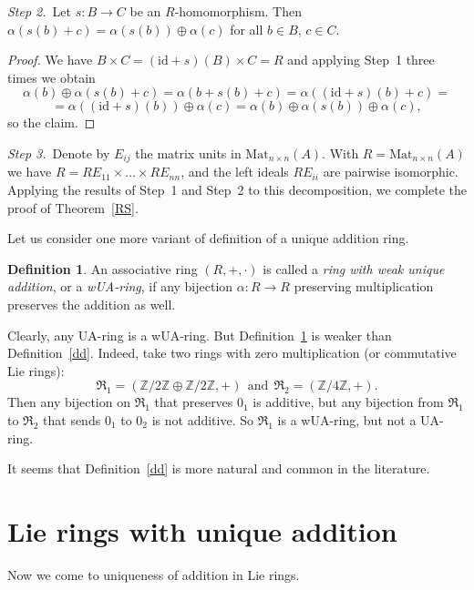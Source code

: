 \documentclass[a4paper,draft,reqno,12pt]{amsart}
\theoremstyle{definition}
\newtheorem{definition}{Definition}
\theoremstyle{remark}
\begin{document}
{\it Step 2.}\ Let $s\colon B\to C$ be an $R$-homomorphism. Then $\alpha(s(b)+c)=\alpha(s(b))\oplus\alpha(c)$ for all $b\in B$, $c\in C$. 

\begin{proof}
We have $B\times C=(\text{id}+s)(B)\times C=R$ and applying Step~1 three times we obtain 
$$
\alpha(b)\oplus\alpha(s(b)+c)=\alpha(b+s(b)+c)=\alpha((\text{id}+s)(b)+c)=
$$
$$
=\alpha((\text{id}+s)(b))\oplus\alpha(c)=\alpha(b)\oplus\alpha(s(b))\oplus\alpha(c),
$$ 
so the claim. 
\end{proof}

{\it Step 3.}\ Denote by $E_{ij}$ the matrix units in $\text{Mat}_{n\times n}(A)$. With $R=\text{Mat}_{n\times n}(A)$ we have $R=RE_{11}\times\ldots\times RE_{nn}$, and the left ideals $RE_{ii}$ are pairwise isomorphic. Applying the results of Step~1 and Step~2 to this decomposition, we complete the proof of Theorem~\ref{RS}. 

\bigskip

Let us consider one more variant of definition of a unique addition ring.

\begin{definition}
\label{dwua}
An associative ring $(R,+,\cdot)$ is called a {\it ring with weak unique addition}, or a {\it wUA-ring}, if any bijection $\alpha\colon R\to R$ preserving multiplication preserves the addition as well. 
\end{definition} 

Clearly, any UA-ring is a wUA-ring. But Definition~\ref{dwua} is weaker than Definition~\ref{dd}. Indeed, take two rings with zero multiplication (or commutative Lie rings): 
$$
\mathfrak{R}_1=(\mathbb{Z}/2\mathbb{Z}\oplus\mathbb{Z}/2\mathbb{Z},+)\  \ \text{and} \ \ \mathfrak{R}_2=(\mathbb{Z}/4\mathbb{Z},+).
$$ 
Then any bijection on $\mathfrak{R_1}$ that preserves $0_1$ is additive, but any bijection from $\mathfrak{R_1}$ to $\mathfrak{R_2}$ that sends $0_1$ to $0_2$ is not additive. 
So $\mathfrak{R_1}$ is a wUA-ring, but not a UA-ring. 

\smallskip

It seems that Definition~\ref{dd} is more natural and common in the literature. 

\section{Lie rings with unique addition}
\label{lua}

Now we come to uniqueness of addition in Lie rings.
\end{document}
